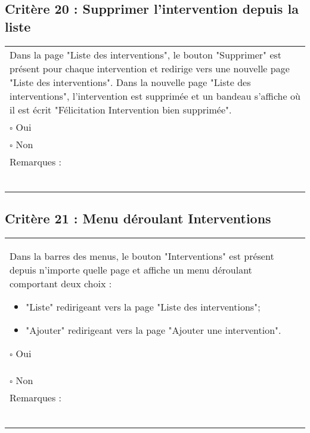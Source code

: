   		
  		
  			\subsection*{Critère 20 : Supprimer l'intervention depuis la liste}
	
	\begin{center}
    	 		\begin{tabular}[h]{|p{}|}
			\hline
				Dans la page "Liste des interventions", le bouton "Supprimer" est présent pour chaque intervention et redirige vers une nouvelle page "Liste des interventions". Dans la nouvelle page "Liste des interventions", l'intervention est supprimée et un bandeau s'affiche où il est écrit "Félicitation Intervention bien supprimée".
				\\
				$\square$ Oui  \\ $\square$ Non \\\hline Remarques : \\ ~\\
			 \\\hline
     		\end{tabular}
  		\end{center}

  		
  			\subsection*{Critère 21 : Menu déroulant Interventions}
	
	\begin{center}
    	 		\begin{tabular}[h]{|p{}|}
			\hline
				Dans la barres des menus, le bouton "Interventions" est présent depuis n'importe quelle page et affiche un menu déroulant comportant deux choix :  
				\begin{itemize}
					\item "Liste" redirigeant vers la page "Liste des interventions";
					\item "Ajouter" redirigeant vers la page "Ajouter une intervention".
				\end{itemize}
				$\square$ Oui  \\ $\square$ Non \\\hline Remarques : \\ ~\\
			 \\\hline
     		\end{tabular}
  		\end{center}
  		
